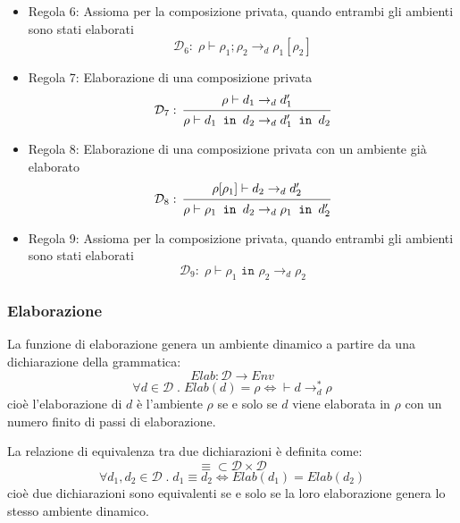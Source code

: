 \documentclass[a4paper]{article}
\begin{document}
\begin{itemize}
  \item Regola 6: Assioma per la composizione privata, quando entrambi gli ambienti
    sono stati elaborati
    \[
      \mathcal{D}_6: \; \rho \vdash \rho_1; \rho_2 \to_d \rho_1[\rho_2]
    \] 

  \item Regola 7: Elaborazione di una composizione privata
    \[
      \mathcal{D}_7: \;
      \begin{prooftree}
        \hypo{\rho \vdash d_1 \to_d d'_1}
        \infer1{\rho \vdash d_1 \texttt{ in } d_2 \to_d d'_1 \texttt{ in } d_2}
      \end{prooftree}
    \]

  \item Regola 8: Elaborazione di una composizione privata con un ambiente già elaborato
    \[
      \mathcal{D}_8: \;
      \begin{prooftree}
        \hypo{\rho[\rho_1] \vdash d_2 \to_d d'_2}
        \infer1{\rho \vdash \rho_1 \texttt{ in } d_2 \to_d \rho_1 \texttt{ in } d'_2}
      \end{prooftree}
    \]

  \item Regola 9: Assioma per la composizione privata, quando entrambi gli ambienti
    sono stati elaborati
    \[
      \mathcal{D}_9: \; \rho \vdash \rho_1 \texttt{ in } \rho_2 \to_d \rho_2
    \]
\end{itemize}

\subsubsection{Elaborazione}
\begin{definition}
  La funzione di elaborazione genera un ambiente dinamico a partire da una dichiarazione
  della grammatica:
  \[
    Elab: \mathcal{D} \to Env
  \] 
  \[
    \forall d \in \mathcal{D} \;.\; Elab(d) = \rho \iff \vdash d \to_d^* \rho
  \] 
  cioè l'elaborazione di \( d \) è l'ambiente \( \rho  \) se e solo se \( d \) viene
  elaborata in \( \rho  \) con un numero finito di passi di elaborazione.
\end{definition}

\begin{definition}
  La relazione di equivalenza tra due dichiarazioni è definita come:
  \[
    \equiv \subset \mathcal{D} \times \mathcal{D}
  \] 
  \[
    \forall d_1, d_2 \in \mathcal{D} \;.\; d_1 \equiv d_2 \iff Elab(d_1) = Elab(d_2)
  \] 
  cioè due dichiarazioni sono equivalenti se e solo se la loro elaborazione genera
  lo stesso ambiente dinamico.
\end{definition}
\end{document}
